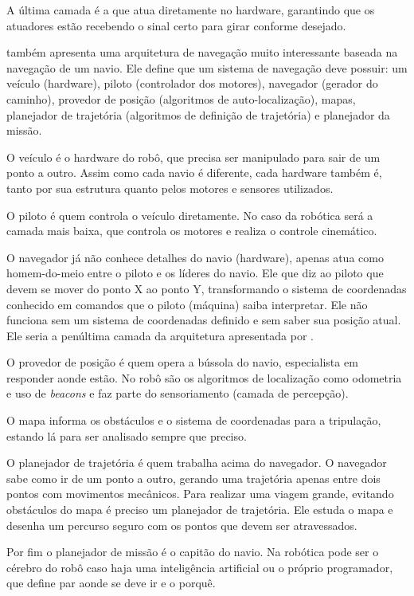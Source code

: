A última camada é a que atua diretamente no hardware, garantindo que os atuadores estão recebendo o sinal certo para girar conforme desejado.

\cite{Bagnall2011} também apresenta uma arquitetura de navegação muito interessante baseada na navegação de um navio. Ele define que um sistema de navegação deve possuir: um veículo (hardware), piloto (controlador dos motores), navegador (gerador do caminho), provedor de posição (algoritmos de auto-localização), mapas, planejador de trajetória (algoritmos de definição de trajetória)  e planejador da missão.

O veículo é o hardware do robô, que precisa ser manipulado para sair de um ponto a outro. Assim como cada navio é diferente, cada hardware também é, tanto por sua estrutura quanto pelos motores e sensores utilizados.

O piloto é quem controla o veículo diretamente. No caso da robótica será a camada mais baixa, que controla os motores e realiza o controle cinemático.

O navegador já não conhece detalhes do navio (hardware), apenas atua como homem-do-meio entre o piloto e os líderes do navio. Ele que diz ao piloto que devem se mover do ponto X ao ponto Y, transformando o sistema de coordenadas conhecido em comandos que o piloto (máquina) saiba interpretar. Ele não funciona sem um sistema de coordenadas definido e sem saber sua posição atual. Ele seria a penúltima camada da arquitetura apresentada por \cite{Vieira2005}.

O provedor de posição é quem opera a bússola do navio, especialista em responder aonde estão. No robô são os algoritmos de localização como odometria e uso de \textit{beacons} e faz parte do sensoriamento (camada de percepção).

O mapa informa os obstáculos e o sistema de coordenadas para a tripulação, estando lá para ser analisado sempre que preciso.

O planejador de trajetória é quem trabalha acima do navegador. O navegador sabe como ir de um ponto a outro, gerando uma trajetória apenas entre dois pontos com movimentos mecânicos. Para realizar uma viagem grande, evitando obstáculos do mapa é preciso um planejador de trajetória. Ele estuda o mapa e desenha um percurso seguro com os pontos que devem ser atravessados.

Por fim o planejador de missão é o capitão do navio. Na robótica pode ser o cérebro do robô caso haja uma inteligência artificial ou o próprio programador, que define par aonde se deve ir e o porquê.

